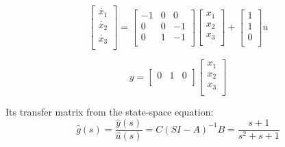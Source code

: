 \documentclass{article}
\begin{document}
\begin{equation*}       %
    \left[                %
    \begin{array}{c}   %
    \dot{x_1} \\  %
    \dot{x_2} \\  %
    \dot{x_3} \\
    \end{array}
    \right]=      %
    \left[                %
    \begin{array}{ccc}   %
    -1 & 0 & 0\\
    0 & 0 & -1\\
    0 & 1 & -1\\    
    \end{array}
    \right]
    \left[                %
    \begin{array}{c}   %
    x_1 \\  %
    x_2 \\  %
    x_3 \\
    \end{array}
    \right]+
    \left[                %
    \begin{array}{c}   %
    1 \\  %
    1 \\  %
    0 \\
    \end{array}
    \right]u               
\end{equation*}

\begin{equation*}
y=\left[
\begin{array}{ccc}
0 & 1 & 0\\
\end{array}
\right]
\left[
\begin{array}{c}
x_1 \\  %
x_2 \\  %
x_3 \\
\end{array}
\right]
\end{equation*}


Its transfer matrix from the state-space equation:\\
\[\hat{g}(s)=\frac{\hat{y}(s)}{\hat{u}(s)}=C(SI-A)^{-1}B=\frac{s+1}{s^2+s+1}\]
\end{document}
